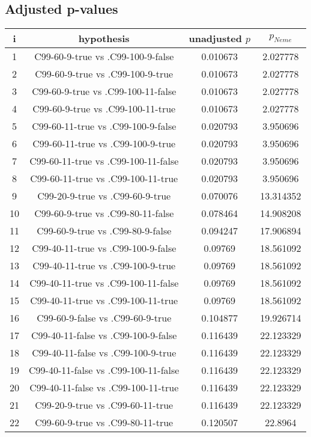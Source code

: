 \documentclass[a4paper,10pt]{article}
\begin{document}
\begin{landscape}
\pagebreak

\subsection{Adjusted p-values}

\begin{table}[!htp]
\centering\scriptsize
\begin{tabular}{cccc}
i&hypothesis&unadjusted $p$&$p_{Neme}$\\
\hline1&C99-60-9-true vs .C99-100-9-false&0.010673&2.027778\\
2&C99-60-9-true vs .C99-100-9-true&0.010673&2.027778\\
3&C99-60-9-true vs .C99-100-11-false&0.010673&2.027778\\
4&C99-60-9-true vs .C99-100-11-true&0.010673&2.027778\\
5&C99-60-11-true vs .C99-100-9-false&0.020793&3.950696\\
6&C99-60-11-true vs .C99-100-9-true&0.020793&3.950696\\
7&C99-60-11-true vs .C99-100-11-false&0.020793&3.950696\\
8&C99-60-11-true vs .C99-100-11-true&0.020793&3.950696\\
9&C99-20-9-true vs .C99-60-9-true&0.070076&13.314352\\
10&C99-60-9-true vs .C99-80-11-false&0.078464&14.908208\\
11&C99-60-9-true vs .C99-80-9-false&0.094247&17.906894\\
12&C99-40-11-true vs .C99-100-9-false&0.09769&18.561092\\
13&C99-40-11-true vs .C99-100-9-true&0.09769&18.561092\\
14&C99-40-11-true vs .C99-100-11-false&0.09769&18.561092\\
15&C99-40-11-true vs .C99-100-11-true&0.09769&18.561092\\
16&C99-60-9-false vs .C99-60-9-true&0.104877&19.926714\\
17&C99-40-11-false vs .C99-100-9-false&0.116439&22.123329\\
18&C99-40-11-false vs .C99-100-9-true&0.116439&22.123329\\
19&C99-40-11-false vs .C99-100-11-false&0.116439&22.123329\\
20&C99-40-11-false vs .C99-100-11-true&0.116439&22.123329\\
21&C99-20-9-true vs .C99-60-11-true&0.116439&22.123329\\
22&C99-60-9-true vs .C99-80-11-true&0.120507&22.8964\\

\end{tabular}
\end{table}
\end{landscape}
\end{document}
